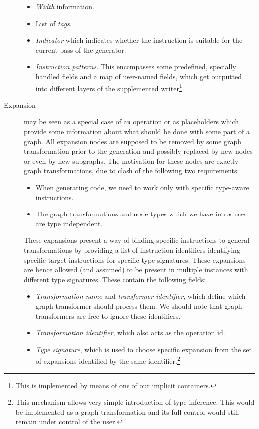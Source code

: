 \begin{description}
    \begin{itemize}
      \item \emph{Width} information.
      \item List of \emph{tags}.
      \item \emph{Indicator} which indicates whether the instruction is suitable for the current pass of the generator.
      \item \emph{Instruction patterns}. This encompasses some predefined, specially handled fields and a map of user-named fields, which get outputted into different layers of the supplemented writer\footnote{This is implemented by means of one of our implicit containers.}.
    \end{itemize}
  \item[Expansion] may be seen as a special case of an operation or as placeholders which provide some information about what should be done with some part of a graph. All expansion nodes are supposed to be removed by some graph transformation prior to the generation and possibly replaced by new nodes or even by new subgraphs. The motivation for these nodes are exactly graph transformations, due to clash of the following two requirements:
    \begin{itemize}
      \item When generating code, we need to work only with specific type-aware instructions. 
      \item The graph transformations and node types which we have introduced are type independent. 
    \end{itemize}
    These expansions present a way of binding specific instructions to general transformations by providing a list of instruction identifiers identifying specific target instructions for specific type signatures. These expansions are hence allowed (and assumed) to be present in multiple instances with different type signatures. These contain the following fields:
    \begin{itemize}
      \item \emph{Transformation name} and \emph{transformer identifier}, which define which graph transformer should process them. We should note that graph transformers are free to ignore these identifiers.
      \item \emph{Transformation identifier}, which also acts as the operation id.
      \item \emph{Type signature}, which is used to choose specific expansion from the set of expansions identified by the same identifier.\footnote{This mechanism allows very simple introduction of type inference. This would be implemented as a graph transformation and its full control would still remain under control of the user.}

\end{itemize}
\end{description}
